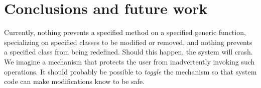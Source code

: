 \section{Conclusions and future work}

Currently, nothing prevents a specified method on a specified generic
function, specializing on specified classes to be modified or removed,
and nothing prevents a specified class from being redefined.  Should
this happen, the system will crash.  We imagine a mechanism that
protects the user from inadvertently invoking such operations.  It
should probably be possible to \emph{toggle} the mechanism so that
system code can make modifications know to be safe. 





